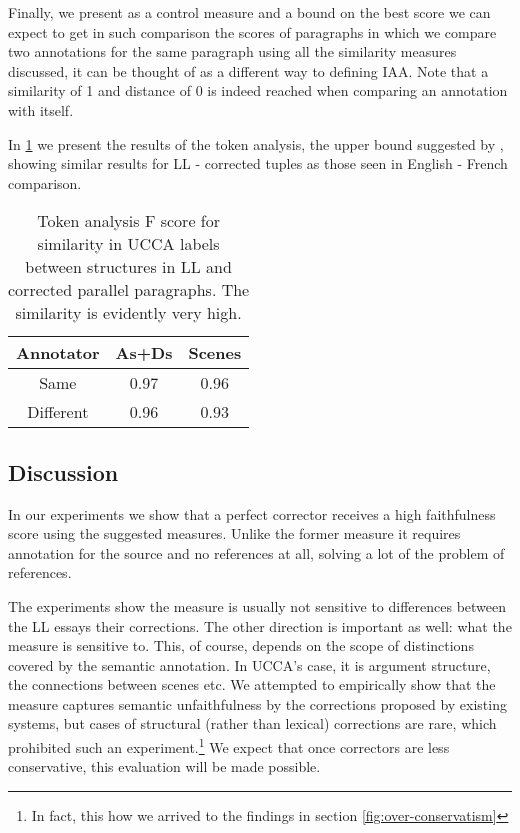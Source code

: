 		Finally, we present as a control measure and a bound on the best score
		we can expect to get in such comparison the scores of paragraphs
		in which we compare two annotations for the same paragraph using all
		the similarity measures discussed, it can be thought of as a different
		way to defining IAA. Note that a similarity
		of 1 and distance of 0 is indeed reached when comparing an annotation with itself.
		
		In \ref{tab:Token_analysis} we present the results of the token analysis, the
		upper bound suggested by \cite{sulem2015conceptual}, showing similar
		results for LL - corrected tuples as those seen in English
		- French comparison.
		\vspace*{-\baselineskip}
		\begin{table}[h!]
			\centering
			\begin{tabular}{c|c|c}
				Annotator& As+Ds & Scenes\\
				\hline
				Same  & 0.97 & 0.96\\
				Different & 0.96
				& 0.93
				\\
			\end{tabular}
			\caption{Token analysis F score for similarity in UCCA labels between structures in LL and corrected parallel paragraphs. The similarity is evidently very high.\label{tab:Token_analysis}}
		\end{table}
		
		\subsection{Discussion}
		In our experiments we show that a perfect corrector receives a high faithfulness score using the suggested measures. Unlike the former measure it requires annotation for the source and no references at all, solving a lot of the problem of references.
		
		The experiments show the measure is usually not sensitive to differences between the LL essays their corrections. The other direction is important as well: what the measure is sensitive to. This, of course, depends on the scope of distinctions covered by the semantic annotation. In UCCA's case, it is argument structure, the connections between scenes etc. We attempted to empirically show that the measure
		captures semantic unfaithfulness by the corrections proposed by existing systems, but cases of structural (rather than lexical) corrections are rare, which prohibited such an experiment.\footnote{In fact, this how we arrived to the findings in section \ref{fig:over-conservatism}} We expect that once correctors are less conservative, this evaluation will be made possible.
		
